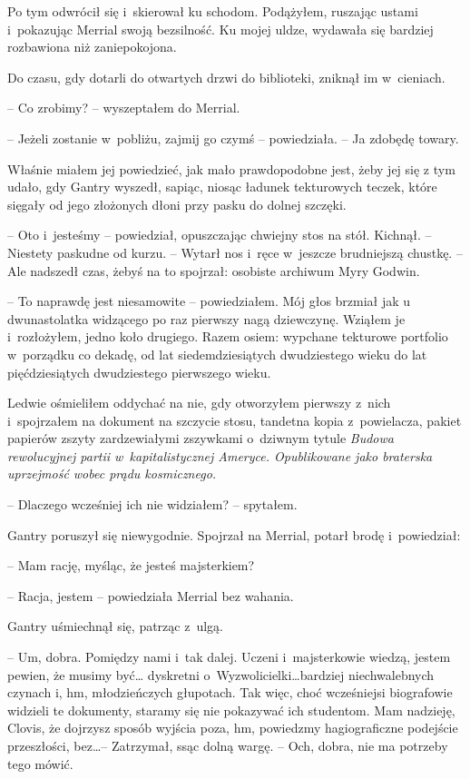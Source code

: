 \documentclass[oneside,polish,11pt,sfheadings]{mwbk}
\begin{document}
Po tym odwrócił się i~skierował ku schodom. Podążyłem, ruszając ustami i~pokazując Merrial swoją bezsilność. Ku mojej uldze, wydawała się
bardziej rozbawiona niż zaniepokojona.

Do czasu, gdy dotarli do otwartych drzwi do biblioteki, zniknął im w~cieniach.

-- Co zrobimy? -- wyszeptałem do Merrial.

-- Jeżeli zostanie w~pobliżu, zajmij go czymś -- powiedziała. -- Ja zdobędę
towary.

Właśnie miałem jej powiedzieć, jak mało prawdopodobne jest, żeby jej się
z tym udało, gdy Gantry wyszedł, sapiąc, niosąc ładunek tekturowych
teczek, które sięgały od jego złożonych dłoni przy pasku do dolnej
szczęki.

-- Oto i~jesteśmy -- powiedział, opuszczając chwiejny stos na stół.
Kichnął. -- Niestety paskudne od kurzu. -- Wytarł nos i~ręce w~jeszcze
brudniejszą chustkę. -- Ale nadszedł czas, żebyś na to spojrzał: osobiste
archiwum Myry Godwin.

-- To naprawdę jest niesamowite -- powiedziałem. Mój głos brzmiał jak u
dwunastolatka widzącego po raz pierwszy nagą dziewczynę. Wziąłem je i~rozłożyłem, jedno koło drugiego. Razem osiem: wypchane tekturowe
portfolio w~porządku co dekadę, od lat siedemdziesiątych dwudziestego
wieku do lat pięćdziesiątych dwudziestego pierwszego wieku.

Ledwie ośmieliłem oddychać na nie, gdy otworzyłem pierwszy z~nich i~spojrzałem na dokument na szczycie stosu, tandetna kopia z~powielacza,
pakiet papierów zszyty zardzewiałymi zszywkami o~dziwnym tytule
\textit{Budowa rewolucyjnej partii w~kapitalistycznej Ameryce.
Opublikowane jako braterska uprzejmość wobec prądu kosmicznego.}

-- Dlaczego wcześniej ich nie widziałem? -- spytałem.

Gantry poruszył się niewygodnie. Spojrzał na Merrial, potarł brodę i~powiedział: 

-- Mam rację, myśląc, że jesteś majsterkiem?

-- Racja, jestem -- powiedziała Merrial bez wahania.

Gantry uśmiechnął się, patrząc z~ulgą. 

-- Um, dobra. Pomiędzy nami i~tak
dalej. Uczeni i~majsterkowie wiedzą, jestem pewien, że musimy być\ldots
dyskretni o~Wyzwolicielki\ldots bardziej niechwalebnych czynach i, hm,
młodzieńczych głupotach. Tak więc, choć wcześniejsi biografowie widzieli
te dokumenty, staramy się nie pokazywać ich studentom. Mam nadzieję,
Clovis, że dojrzysz sposób wyjścia poza, hm, powiedzmy hagiograficzne
podejście przeszłości, bez\ldots -- Zatrzymał, ssąc dolną wargę. -- Och,
dobra, nie ma potrzeby tego mówić.
\end{document}
